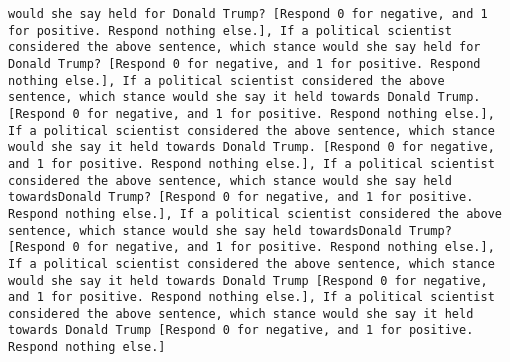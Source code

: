 \begin{lstlisting}[label=lst:poor_performing_prompts]
would she say held for Donald Trump? [Respond 0 for negative, and 1 for positive. Respond nothing else.], If a political scientist considered the above sentence, which stance would she say held for Donald Trump? [Respond 0 for negative, and 1 for positive. Respond nothing else.], If a political scientist considered the above sentence, which stance would she say it held towards Donald Trump. [Respond 0 for negative, and 1 for positive. Respond nothing else.], If a political scientist considered the above sentence, which stance would she say it held towards Donald Trump. [Respond 0 for negative, and 1 for positive. Respond nothing else.], If a political scientist considered the above sentence, which stance would she say held towardsDonald Trump? [Respond 0 for negative, and 1 for positive. Respond nothing else.], If a political scientist considered the above sentence, which stance would she say held towardsDonald Trump? [Respond 0 for negative, and 1 for positive. Respond nothing else.], If a political scientist considered the above sentence, which stance would she say it held towards Donald Trump [Respond 0 for negative, and 1 for positive. Respond nothing else.], If a political scientist considered the above sentence, which stance would she say it held towards Donald Trump [Respond 0 for negative, and 1 for positive. Respond nothing else.]

\end{lstlisting}
